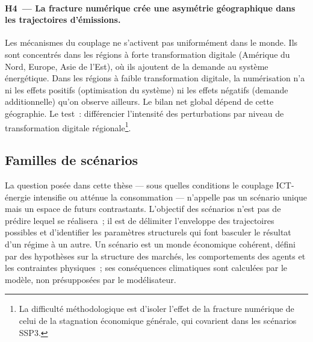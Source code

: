 \paragraph{H4~--- La fracture numérique crée une asymétrie géographique dans les trajectoires d'émissions.}
Les mécanismes du couplage ne s'activent pas uniformément dans le monde. Ils sont concentrés dans les régions à forte transformation digitale (Amérique du Nord, Europe, Asie de l'Est), où ils ajoutent de la demande au système énergétique. Dans les régions à faible transformation digitale, la numérisation n'a ni les effets positifs (optimisation du système) ni les effets négatifs (demande additionnelle) qu'on observe ailleurs. Le bilan net global dépend de cette géographie. Le test~: différencier l'intensité des perturbations par niveau de transformation digitale régionale\footnote{La difficulté méthodologique est d'isoler l'effet de la fracture numérique de celui de la stagnation économique générale, qui covarient dans les scénarios SSP3.}.


\subsection{Familles de scénarios}\label{sec:ch4-scenarios}


La question posée dans cette thèse --- sous quelles conditions le couplage ICT-énergie intensifie ou atténue la consommation --- n'appelle pas un scénario unique mais un espace de futurs contrastants. L'objectif des scénarios n'est pas de prédire lequel se réalisera~; il est de délimiter l'enveloppe des trajectoires possibles et d'identifier les paramètres structurels qui font basculer le résultat d'un régime à un autre. Un scénario est un monde économique cohérent, défini par des hypothèses sur la structure des marchés, les comportements des agents et les contraintes physiques~; ses conséquences climatiques sont calculées par le modèle, non présupposées par le modélisateur.

